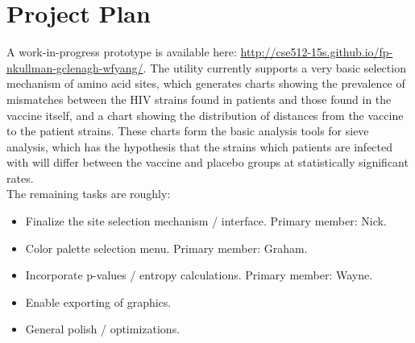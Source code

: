 \documentclass{article}
\begin{document}
\section{Project Plan}

A work-in-progress prototype is available here: \url{http://cse512-15s.github.io/fp-nkullman-gclenagh-wfyang/}.
The utility currently supports a very basic selection mechanism of amino acid sites, which generates charts showing the prevalence of mismatches between the HIV strains found in patients and those found in the vaccine itself, and a chart showing the distribution of distances from the vaccine to the patient strains. These charts form the basic analysis tools for sieve analysis, which has the hypothesis that the strains which patients are infected with will differ between the vaccine and placebo groups at statistically significant rates.\\

The remaining tasks are roughly:
\begin{itemize}
\item Finalize the site selection mechanism / interface.  Primary member: Nick.
\item Color palette selection menu.  Primary member: Graham.
\item Incorporate p-values / entropy calculations. Primary member: Wayne.
\item Enable exporting of graphics. 
\item General polish / optimizations. 
\end{itemize}



\end{document}

